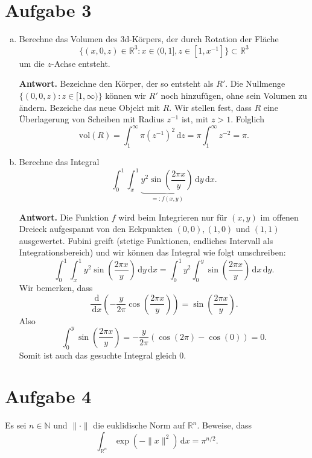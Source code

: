 \documentclass[10pt]{article}\usepackage[]{graphicx}\usepackage[]{color}
\newcommand{\N}{\mathbb{N}}
\newcommand{\R}{\mathbb{R}}
\newcommand{\df}{\,\textrm{d}}
\begin{document}
\section*{Aufgabe 3}
\begin{enumerate}[(a)]
  \item Berechne das Volumen des 3d-Körpers, der durch
        Rotation der Fläche
        \[
          \{(x, 0, z) \in \R^3 : x \in (0, 1], z \in [1, x^{-1}]\} \subset \R^3
        \]
        um die $z$-Achse entsteht.
        
  \textbf{Antwort.} Bezeichne den Körper, der so entsteht als $R'$.
  Die Nullmenge $\{(0, 0, z) : z \in [1, \infty)\}$ können wir $R'$
  noch hinzufügen, ohne sein Volumen zu ändern. Bezeiche das neue Objekt
  mit $R$. Wir stellen fest, dass $R$ eine Überlagerung von Scheiben
  mit Radius $z^{-1}$ ist, mit $z > 1$. Folglich
  \[
    \textrm{vol}(R) = \int_1^{\infty} \pi (z^{-1})^2 \df z = \pi \int_1^{\infty} z^{-2} = \pi.
  \]
        
  \item Berechne das Integral
  \[
    \int_0^1 \int_x^1 \underbrace{y^2\sin\left(\frac{2\pi x}{y}\right)}_{=: f(x,y)} \df y \df x.
  \]
  
  \textbf{Antwort.} Die Funktion $f$ wird beim Integrieren nur für 
  $(x,y)$ im offenen Dreieck aufgespannt von den Eckpunkten 
  $(0,0), (1, 0)$ und $(1, 1)$ ausgewertet. 
  Fubini greift (stetige Funktionen, endliches Intervall als Integrationsbereich)
  und wir können das Integral wie folgt umschreiben:
    \[
    \int_0^1 \int_x^1 y^2\sin\left(\frac{2\pi x}{y}\right) \df y \df x
    = \int_0^1 y^2 \int_0^y \sin\left(\frac{2\pi x}{y}\right) \df x \df y.
  \]
  Wir bemerken, dass 
  \[
  \frac{\df}{\df x} \left(-\frac{y}{2\pi} \cos\left(\frac{2\pi x}{y}\right)\right)
  = \sin\left(\frac{2\pi x}{y}\right).
  \]
  Also
  \[
    \int_0^y \sin\left(\frac{2\pi x}{y}\right)  = -\frac{y}{2\pi}(\cos(2\pi) - \cos(0)) = 0.
  \]
  Somit ist auch das gesuchte Integral gleich 0.
\end{enumerate}

\section*{Aufgabe 4}
Es sei $n \in \N$ und $\| \cdot \|$ die euklidische
Norm auf $\R^n$. Beweise, dass
\[
  \int_{\R^n} \exp(-\|x\|^2) \df x = \pi^{n/2}.
\]
\end{document}
